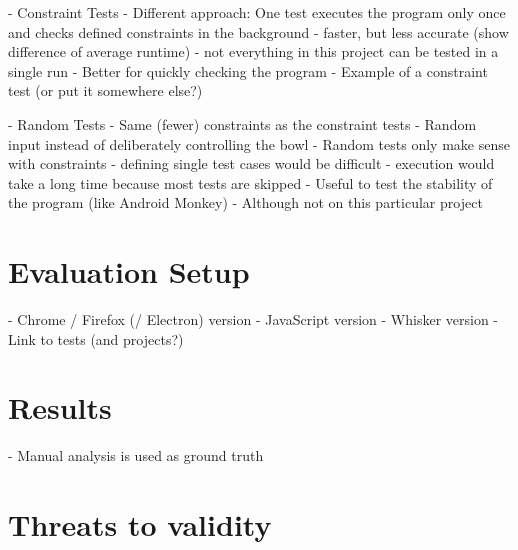 - Constraint Tests
    - Different approach: One test executes the program only once and checks defined constraints in the background
    - faster, but less accurate (show difference of average runtime)
    - not everything in this project can be tested in a single run
    - Better for quickly checking the program
    - Example of a constraint test (or put it somewhere else?)

- Random Tests
    - Same (fewer) constraints as the constraint tests
    - Random input instead of deliberately controlling the bowl
    - Random tests only make sense with constraints
        - defining single test cases would be difficult
        - execution would take a long time because most tests are skipped
    - Useful to test the stability of the program (like Android Monkey)
        - Although not on this particular project

\section{Evaluation Setup}
- Chrome / Firefox (/ Electron) version
- JavaScript version
- Whisker version
- Link to tests (and projects?)

\section{Results}
- Manual analysis is used as ground truth

\section{Threats to validity}



